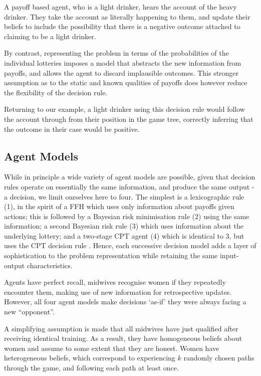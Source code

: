 \documentclass[graybox]{svmult}
\begin{document}
A payoff based agent, who is a light drinker, hears the account of the heavy drinker. They take the account as literally happening to them, and update their beliefs to include the possibility that there is a negative outcome attached to claiming to be a light drinker.

By contrast, representing the problem in terms of the probabilities of the individual lotteries imposes a model that abstracts the new information from payoffs, and allows the agent to discard implausible outcomes. This stronger assumption as to the static and known qualities of payoffs does however reduce the flexibility of the decision rule.

Returning to our example, a light drinker using this decision rule would follow the account through from their position in the game tree, correctly inferring that the outcome in their case would be positive. \subsection{Agent Models}
\label{sub:the_agents}

While in principle a wide variety of agent models are possible, given that decision rules operate on essentially the same information, and produce the same output - a decision, we limit ourselves here to four. The simplest is a lexicographic rule (1), in the spirit of a \acl{FFH} \citep{Gigerenzer2004} which uses only information about payoffs given actions; this is followed by a Bayesian risk minimisation rule (2) using the same information; a second Bayesian risk rule (3) which uses information about the underlying lottery; and a two-stage \ac{CPT} \citep{Hau2008} agent (4) which is identical to 3, but uses the \ac{CPT} decision rule \cite{Tversky1992}. Hence, each successive decision model adds a layer of sophistication to the problem representation while retaining the same input-output characteristics.

Agents have perfect recall, midwives recognise women if they repeatedly encounter them, making use of new information for retrospective updates. However, all four agent models make decisions `as-if' they were always facing a new \enquote{opponent}.

A simplifying assumption is made that all midwives have just qualified after receiving identical training. As a result, they have homogeneous beliefs about  women and assume to some extent that they are honest.
Women have heterogeneous beliefs, which correspond to experiencing \(k\) randomly chosen paths through the game, and following each path at least once.
\end{document}
